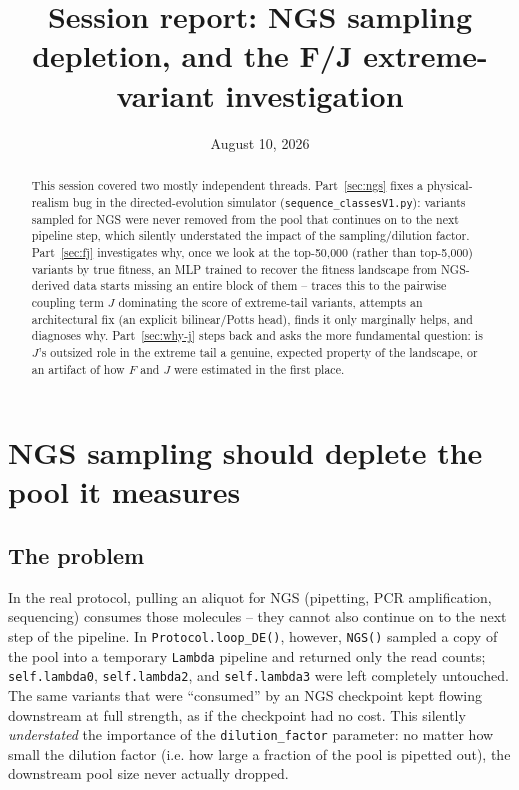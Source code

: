 \documentclass[11pt]{article}
\title{Session report: NGS sampling depletion, and the F/J extreme-variant investigation}
\author{}
\date{August 10, 2026}
\newcommand{\code}[1]{\texttt{#1}}
\begin{document}
\sloppy
\maketitle

\begin{abstract}
This session covered two mostly independent threads. Part~\ref{sec:ngs} fixes a physical-realism
bug in the directed-evolution simulator (\code{sequence\_classesV1.py}): variants sampled for
NGS were never removed from the pool that continues on to the next pipeline step, which silently
understated the impact of the sampling/dilution factor. Part~\ref{sec:fj} investigates why, once
we look at the top-50{,}000 (rather than top-5{,}000) variants by true fitness, an MLP trained to
recover the fitness landscape from NGS-derived data starts missing an entire block of them --
traces this to the pairwise coupling term $J$ dominating the score of extreme-tail variants,
attempts an architectural fix (an explicit bilinear/Potts head), finds it only marginally helps,
and diagnoses why. Part~\ref{sec:why-j} steps back and asks the more fundamental question: is
$J$'s outsized role in the extreme tail a genuine, expected property of the landscape, or an
artifact of how $F$ and $J$ were estimated in the first place.
\end{abstract}

\tableofcontents

\section{NGS sampling should deplete the pool it measures}
\label{sec:ngs}

\subsection{The problem}

In the real protocol, pulling an aliquot for NGS (pipetting, PCR amplification, sequencing)
consumes those molecules -- they cannot also continue on to the next step of the pipeline. In
\code{Protocol.loop\_DE()}, however, \code{NGS()} sampled a copy of the pool into a temporary
\code{Lambda} pipeline and returned only the read counts; \code{self.lambda0}, \code{self.lambda2},
and \code{self.lambda3} were left completely untouched. The same variants that were ``consumed''
by an NGS checkpoint kept flowing downstream at full strength, as if the checkpoint had no cost.
This silently \emph{understated} the importance of the \code{dilution\_factor} parameter: no matter
how small the dilution factor (i.e. how large a fraction of the pool is pipetted out), the
downstream pool size never actually dropped.
\end{document}
